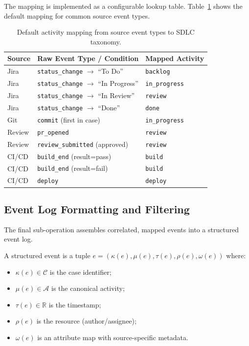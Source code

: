 The mapping is implemented as a configurable lookup table. 
Table~\ref{tab:activity-mapping} shows the default mapping for common 
source event types.

\begin{table}[htbp]
\centering
\caption{Default activity mapping from source event types to SDLC taxonomy.}
\label{tab:activity-mapping}
\small
\begin{tabular}{lll}
\toprule
\textbf{Source} & \textbf{Raw Event Type / Condition} & \textbf{Mapped Activity} \\
\midrule
Jira & \texttt{status\_change} $\to$ ``To Do'' & \texttt{backlog} \\
Jira & \texttt{status\_change} $\to$ ``In Progress'' & \texttt{in\_progress} \\
Jira & \texttt{status\_change} $\to$ ``In Review'' & \texttt{review} \\
Jira & \texttt{status\_change} $\to$ ``Done'' & \texttt{done} \\
Git  & \texttt{commit} (first in case) & \texttt{in\_progress} \\
Review & \texttt{pr\_opened} & \texttt{review} \\
Review & \texttt{review\_submitted} (approved) & \texttt{review} \\
CI/CD & \texttt{build\_end} (result=pass) & \texttt{build} \\
CI/CD & \texttt{build\_end} (result=fail) & \texttt{build} \\
CI/CD & \texttt{deploy} & \texttt{deploy} \\
\bottomrule
\end{tabular}
\end{table}


\subsection{Event Log Formatting and Filtering}
\label{sec:s1-formatting}

The final sub-operation assembles correlated, mapped events into a 
structured event log.

\begin{definition}
\label{def:structured-event}
A structured event is a tuple $e = (\kappa(e), \mu(e), \tau(e), \rho(e), \omega(e))$ where:
\begin{itemize}
    \item $\kappa(e) \in \mathcal{C}$ is the case identifier;
    \item $\mu(e) \in \mathcal{A}$ is the canonical activity;
    \item $\tau(e) \in \mathbb{R}$ is the timestamp;
    \item $\rho(e)$ is the resource (author/assignee);
    \item $\omega(e)$ is an attribute map with source-specific metadata.
\end{itemize}
\end{definition}

